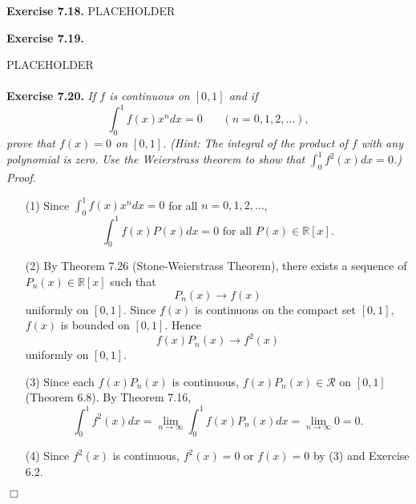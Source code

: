 \documentclass{article}
\begin{document}
\textbf{Exercise 7.18.}
PLACEHOLDER






\textbf{Exercise 7.19.}

PLACEHOLDER \\\\






\textbf{Exercise 7.20.}
\emph{If $f$ is continuous on $[0,1]$ and if
\[
  \int_{0}^{1} f(x) x^n dx = 0
  \:\:\:\:\:\:\:\:
  (n=0,1,2,\ldots),
\]
prove that $f(x) = 0$ on $[0,1]$.
(Hint: The integral of the product of $f$ with any polynomial is zero.
Use the Weierstrass theorem to show that
$\int_{0}^{1} f^2(x) dx = 0$.)} \\

\emph{Proof.}
\begin{enumerate}
\item[(1)]
Since $\int_{0}^{1} f(x) x^n dx = 0$ for all $n = 0,1,2,\ldots$,
\[
  \int_{0}^{1} f(x) P(x) dx = 0 \text{ for all } P(x) \in \mathbb{R}[x].
\]

\item[(2)]
By Theorem 7.26 (Stone-Weierstrass Theorem),
there exists a sequence of $P_n(x) \in \mathbb{R}[x]$ such that
\[
  P_n(x) \to f(x)
\]
uniformly on $[0,1]$.
Since $f(x)$ is continuous on the compact set $[0,1]$, $f(x)$ is bounded on $[0,1]$.
Hence
\[
  f(x) P_n(x) \to f^2(x)
\]
uniformly on $[0,1]$.

\item[(3)]
Since each $f(x) P_n(x)$ is continuous,
$f(x) P_n(x) \in \mathscr{R}$ on $[0,1]$ (Theorem 6.8).
By Theorem 7.16,
\[
  \int_{0}^{1} f^2(x) dx
  = \lim_{n \to \infty} \int_{0}^{1} f(x) P_n(x) dx
  = \lim_{n \to \infty} 0
  = 0.
\]

\item[(4)]
Since $f^2(x)$ is continuous,
$f^2(x) = 0$ or $f(x) = 0$ by (3) and Exercise 6.2.
\end{enumerate}
$\Box$ \\\\



\end{document}
